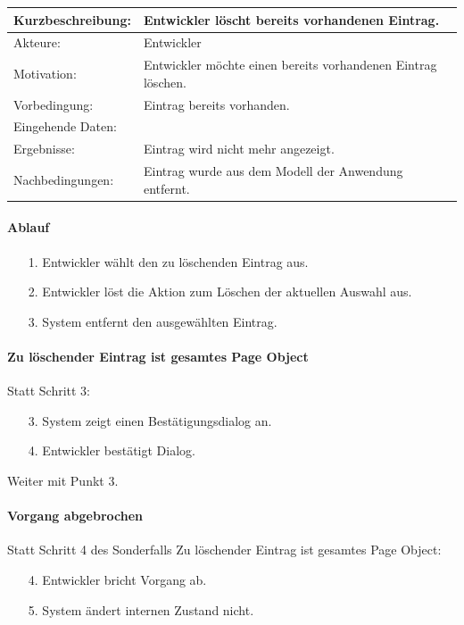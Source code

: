 \begin{tabular}[h]{|p{4cm}|p{}|}
\hline 
\rule[-1ex]{0pt}{2.5ex}Kurzbeschreibung: & 
Entwickler löscht bereits vorhandenen Eintrag. \\  
\hline 
\rule[-1ex]{0pt}{2.5ex}Akteure: & 
Entwickler \\ 
\hline 
\rule[-1ex]{0pt}{2.5ex}Motivation: & 
Entwickler möchte einen bereits vorhandenen Eintrag löschen. \\ 
\hline 
\rule[-1ex]{0pt}{2.5ex}Vorbedingung: & 
Eintrag bereits vorhanden. \\ 
\hline 
\rule[-1ex]{0pt}{2.5ex}Eingehende Daten: & \\ 
\hline 
\rule[-1ex]{0pt}{2.5ex}Ergebnisse: & Eintrag wird nicht mehr angezeigt. \\ 
\hline 
\rule[-1ex]{0pt}{2.5ex}Nachbedingungen: & Eintrag wurde aus dem Modell der Anwendung entfernt.  \\ 
\hline 
\end{tabular} 

\paragraph{Ablauf}

\begin{itemize}[itemsep=0pt]
\item[1.] Entwickler wählt den zu löschenden Eintrag aus.
\item[2.] Entwickler löst die Aktion zum Löschen der aktuellen Auswahl aus. 
\item[3.] System entfernt den ausgewählten Eintrag.
\end{itemize}

\paragraph{Zu löschender Eintrag ist gesamtes Page Object}
Statt Schritt 3:
\begin{itemize}[itemsep=0pt]
\item[3.] System zeigt einen Bestätigungsdialog an. 
\item[4.] Entwickler bestätigt Dialog. 
\end{itemize}
Weiter mit Punkt 3. 

\paragraph{Vorgang abgebrochen}
Statt Schritt 4 des Sonderfalls \grq Zu löschender Eintrag ist gesamtes Page Object\grq:
\begin{itemize}[itemsep=0pt]
\item[4.] Entwickler bricht Vorgang ab. 
\item[5.] System ändert internen Zustand nicht. 
\end{itemize}

